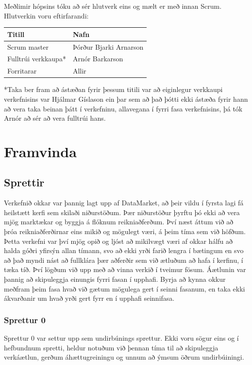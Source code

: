 \documentclass{article}
\begin{document}
Meðlimir hópsins tóku að sér hlutverk eins og mælt er með innan Scrum. Hlutverkin voru eftirfarandi:

\vspace{5 mm}
\begin{tabular}{| l | l |}
\hline
Titill & Nafn \\
\hline
Scrum master & Þórður Bjarki Arnarson\\
\hline
Fulltrúi verkkaupa* & Arnór Barkarson \\
\hline
Forritarar & Allir \\
\hline
\end{tabular}
\vspace{5 mm}

*Taka ber fram að ástæðan fyrir þessum titili var að eiginlegur verkkaupi verkefnisins var Hjálmar Gíslason ein þar sem að það þótti ekki ástæða fyrir hann að vera taka beinan þátt í verkefninu, allavegana í fyrri fasa verkefnisins, þá tók Arnór að sér að vera fulltrúi hans.

\section{Framvinda}
\subsection{Sprettir}
Verkefnið okkar var þannig lagt upp af DataMarket, að þeir vildu í fyrsta lagi fá heilstætt kerfi sem skilaði niðurstöðum. 
Þær niðurstöður þyrftu þó ekki að vera mjög marktækar og byggja á flóknum reikniaðferðum. Því næst áttum við að þróa reikniaðferðirnar eins 
mikið og mögulegt væri, á þeim tíma sem við höfðum. Þetta verkefni var því mjög opið og ljóst að mikilvægt væri 
af okkar hálfu að halda góðri yfirsýn allan tímann, svo að ekki yrði farið lengra í bætingum en svo að það myndi nást að fullklára þær 
aðferðir sem við ætluðum að hafa í kerfinu, í tæka tíð. Því lögðum við upp með að vinna verkið í tveimur fösum. Áætlunin var þannig að skipuleggja
einungis fyrri fasan í upphafi. Byrja að kynna okkur meðfram þeim fasa hvað við gætum mögulega gert í seinni fasanum, en taka ekki ákvarðanir 
um hvað yrði gert fyrr en í upphafi seinnifasa.

\subsubsection{Sprettur 0}
Sprettur 0 var settur upp sem undirbúnings sprettur. Ekki voru sögur eins og í
hefbundnum spretti, heldur notuðum við þennan tíma til að 
skipuleggja verkáætlun, gerðum áhættugreiningu og unnum að ýmsum öðrum
undirbúiningi.
\end{document}
